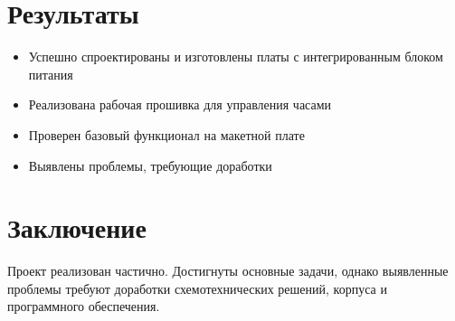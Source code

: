 \documentclass[a4paper,12pt]{article}
\begin{document}
\section{Результаты}
\begin{itemize}
    \item Успешно спроектированы и изготовлены платы с интегрированным блоком питания
    \item Реализована рабочая прошивка для управления часами
    \item Проверен базовый функционал на макетной плате
    \item Выявлены проблемы, требующие доработки
\end{itemize}

\section{Заключение}
Проект реализован частично. Достигнуты основные задачи, однако выявленные проблемы требуют доработки схемотехнических решений, корпуса и программного обеспечения.
\end{document}

